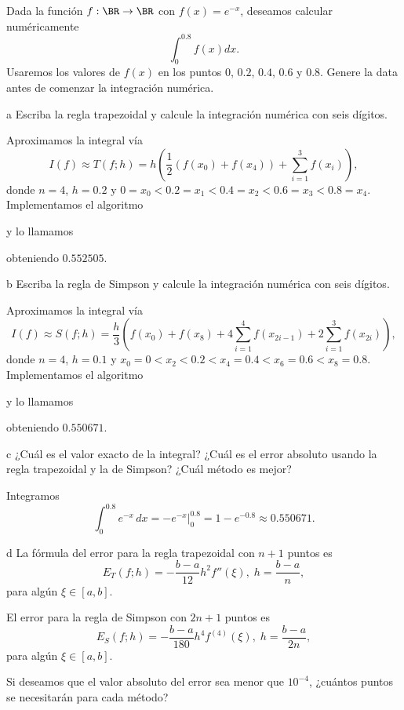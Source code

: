 \begin{statement}{2}
  Dada la funci\'on $f: \BR \to \BR$ con $f(x) = e^{-x}$, deseamos calcular num\'ericamente
  \[
    \int_0^{0.8} f(x) dx.
  \]
  Usaremos los valores de $f(x)$ en los puntos $0$, $0.2$, $0.4$, $0.6$ y $0.8$.
  Genere la data antes de comenzar la integraci\'on num\'erica.
\end{statement}

\begin{statement}{a}
  Escriba la regla trapezoidal y calcule la integraci\'on num\'erica con seis d\'igitos.
\end{statement}

\begin{solution}
  Aproximamos la integral v\'ia
  \[
    I(f) \approx T(f; h) =
    h \left(\frac{1}{2}(f(x_0) + f(x_4)) + \sum_{i = 1}^3 f(x_i)\right),
  \]
  donde $n = 4$, $h = 0.2$ y $0 = x_0 < 0.2 = x_1 < 0.4 = x_2 < 0.6 = x_3 < 0.8 = x_4$.
  Implementamos el algoritmo
  
  y lo llamamos
  
  obteniendo $0.552505$.
\end{solution}

\begin{statement}{b}
  Escriba la regla de Simpson y calcule la integraci\'on num\'erica con seis d\'igitos.
\end{statement}

\begin{solution}
  Aproximamos la integral v\'ia
  \[
    I(f) \approx S(f; h) = \frac{h}{3} \left(f(x_0) + f(x_8) + 4 \sum_{i = 1}^4 f(x_{2i - 1}) + 2 \sum_{i = 1}^3 f(x_{2i})\right),
  \]
  donde $n = 4$, $h = 0.1$ y $x_0 = 0 < x_2 < 0.2 < x_4 = 0.4 < x_6 = 0.6 < x_8 = 0.8$.
  Implementamos el algoritmo
  
  y lo llamamos
  
  obteniendo $0.550671$.
\end{solution}

\begin{statement}{c}
  ¿Cu\'al es el valor exacto de la integral?
  ¿Cu\'al es el error absoluto usando la regla trapezoidal y la de Simpson?
  ¿Cu\'al m\'etodo es mejor?
\end{statement}

\begin{solution}
  Integramos
  \[
      \int_0^{0.8} e^{-x} \, dx = -e^{-x} \Big|_0^{0.8} = 1 - e^{-0.8} \approx 0.550671.
  \]

\end{solution}

\begin{statement}{d}
  La f\'ormula del error para la regla trapezoidal con $n + 1$ puntos es
  \[
    E_T(f; h) = -\frac{b - a}{12} h^2 f''(\xi),\; h = \frac{b - a}{n},
  \]
  para alg\'un $\xi \in [a, b]$.

  El error para la regla de Simpson con $2n + 1$ puntos es
  \[
    E_S(f; h) = -\frac{b - a}{180} h^4 f^{(4)}(\xi),\; h = \frac{b - a}{2n},
  \]
  para alg\'un $\xi \in [a, b]$.

  Si deseamos que el valor absoluto del error sea menor que $10^{-4}$,
  ¿cu\'antos puntos se necesitar\'an para cada m\'etodo?
\end{statement}
